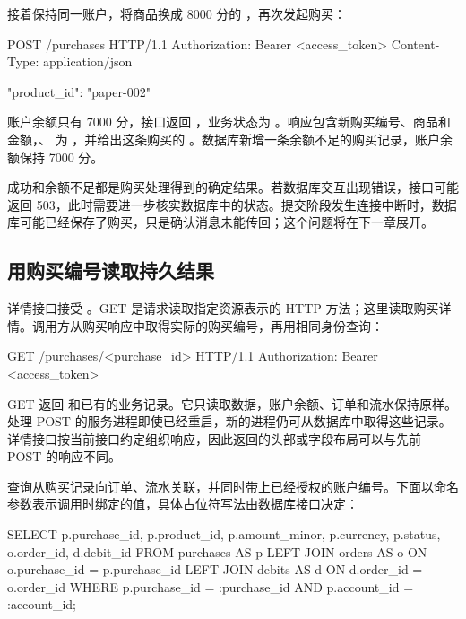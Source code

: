 接着保持同一账户，将商品换成 8000 分的 ，再次发起购买：

\begin{BookCode}
POST /purchases HTTP/1.1
Authorization: Bearer <access_token>
Content-Type: application/json

{"product_id": "paper-002"}
\end{BookCode}

账户余额只有 7000 分，接口返回 ，业务状态为 。响应包含新购买编号、商品和金额，、 为 ，并给出这条购买的 。数据库新增一条余额不足的购买记录，账户余额保持 7000 分。



成功和余额不足都是购买处理得到的确定结果。若数据库交互出现错误，接口可能返回 503，此时需要进一步核实数据库中的状态。提交阶段发生连接中断时，数据库可能已经保存了购买，只是确认消息未能传回；这个问题将在下一章展开。

\subsection*{用购买编号读取持久结果}

详情接口接受 。GET 是请求读取指定资源表示的 HTTP 方法；这里读取购买详情。调用方从购买响应中取得实际的购买编号，再用相同身份查询：

\begin{BookCode}
GET /purchases/<purchase_id> HTTP/1.1
Authorization: Bearer <access_token>
\end{BookCode}

GET 返回  和已有的业务记录。它只读取数据，账户余额、订单和流水保持原样。处理 POST 的服务进程即使已经重启，新的进程仍可从数据库中取得这些记录。详情接口按当前接口约定组织响应，因此返回的头部或字段布局可以与先前 POST 的响应不同。

查询从购买记录向订单、流水关联，并同时带上已经授权的账户编号。下面以命名参数表示调用时绑定的值，具体占位符写法由数据库接口决定：

\begin{BookCode}
SELECT p.purchase_id, p.product_id, p.amount_minor,
       p.currency, p.status,
       o.order_id, d.debit_id
FROM purchases AS p
LEFT JOIN orders AS o ON o.purchase_id = p.purchase_id
LEFT JOIN debits AS d ON d.order_id = o.order_id
WHERE p.purchase_id = :purchase_id
  AND p.account_id = :account_id;
\end{BookCode}

